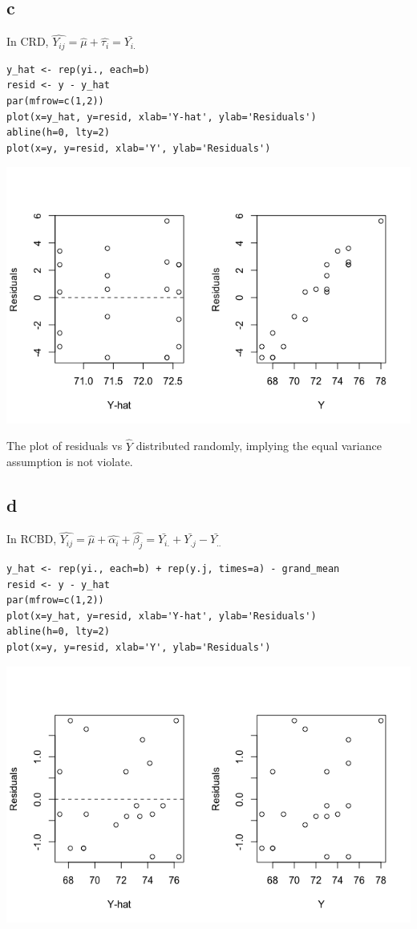 \documentclass[11pt,letterpaper]{article}
\begin{document}
\subsection*{c}
\noindent In CRD, $\hat{Y_{ij}} = \hat{\mu} + \hat{\tau_i} = \bar{Y_{i.}}$
\begin{verbatim}
y_hat <- rep(yi., each=b)
resid <- y - y_hat
par(mfrow=c(1,2))
plot(x=y_hat, y=resid, xlab='Y-hat', ylab='Residuals')
abline(h=0, lty=2)
plot(x=y, y=resid, xlab='Y', ylab='Residuals')
\end{verbatim}
\includegraphics[scale=0.70]{lect-11-1-c.png}

\noindent The plot of residuals vs $\hat{Y}$ distributed randomly, implying the equal variance assumption is not violate. 

\subsection*{d}
\noindent In RCBD, $\hat{Y_{ij}} = \hat{\mu} + \hat{\alpha_i} + \hat{\beta_j} = \bar{Y_{i.}} + \bar{Y_{.j}} - \bar{Y_{..}}$ 
\begin{verbatim}
y_hat <- rep(yi., each=b) + rep(y.j, times=a) - grand_mean
resid <- y - y_hat
par(mfrow=c(1,2))
plot(x=y_hat, y=resid, xlab='Y-hat', ylab='Residuals')
abline(h=0, lty=2)
plot(x=y, y=resid, xlab='Y', ylab='Residuals')
\end{verbatim}
\includegraphics[scale=0.70]{lect-11-1-d.png}
\end{document}
